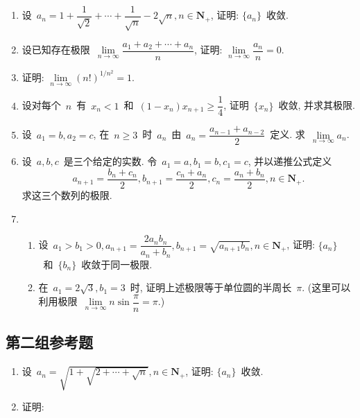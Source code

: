 \documentclass[UTF8,a4paper,10pt,twoside]{book}
\begin{document}
\begin{enumerate}
	\item 设~$a_n=1+\dfrac{1}{\sqrt{2}}+\cdots+\dfrac{1}{\sqrt{n}}-2\sqrt{n}, n\in\mathbf{N}_{+}$, 证明: $\{a_n\}$~收敛.

	\item 设已知存在极限~$\lim\limits_{n\to\infty} \dfrac{a_1+a_2+\cdots+a_n}{n}$, 证明: $\lim\limits_{n\to\infty} \dfrac{a_n}{n}=0$.

	\item 证明: $\lim\limits_{n\to\infty} (n!)^{1/n^2}=1$.

	\item 设对每个~$n$~有~$x_n<1$~和~$(1-x_n)x_{n+1}\geqslant \dfrac{1}{4}$, 证明~$\{x_n\}$~收敛, 并求其极限.

	\item 设~$a_1=b, a_2=c$, 在~$n\geqslant 3$~时~$a_n$~由~$a_n=\dfrac{a_{n-1}+a_{n-2}}{2}$~定义. 求~$\lim\limits_{n\to\infty} a_n$.

	\item 设~$a,b,c$~是三个给定的实数. 令~$a_1=a, b_1=b, c_1=c$, 并以递推公式定义
	      \[
		      a_{n+1}=\dfrac{b_n+c_n}{2}, b_{n+1}=\dfrac{c_n+a_n}{2}, c_n=\dfrac{a_n+b_n}{2}, n\in\mathbf{N}_{+}.
	      \]
	      求这三个数列的极限.

	\item
	      \begin{enumerate}[(1)]
		      \item 设~$a_1>b_1>0, a_{n+1}=\dfrac{2a_nb_n}{a_n+b_n}, b_{n+1}=\sqrt{a_{n+1}b_n}, n\in\mathbf{N}_{+}$, 证明: $\{a_n\}$~和~$\{b_n\}$~收敛于同一极限.
		      \item 在~$a_1=2\sqrt{3}, b_1=3$~时, 证明上述极限等于单位圆的半周长~$\pi$. (这里可以利用极限~$\lim\limits_{n\to\infty} n\sin{\dfrac{\pi}{n}}=\pi$.)
	      \end{enumerate}
\end{enumerate}
\subsection{第二组参考题}
\begin{enumerate}
	\item 设~$a_n=\sqrt{1+\sqrt{2+\cdots+\sqrt{n}}}, n\in\mathbf{N}_{+}$, 证明: $\{a_n\}$~收敛.

	\item 证明:
\end{enumerate}
\end{document}
